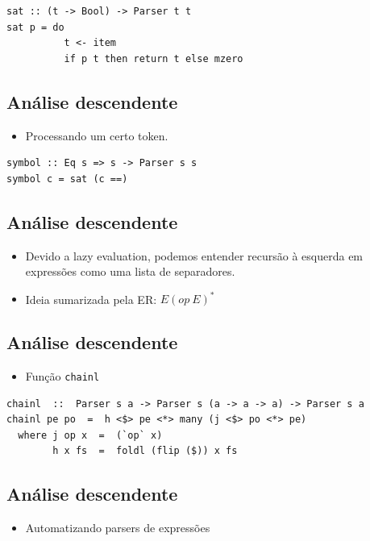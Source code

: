 \documentclass[11pt]{article}
\begin{document}
\begin{verbatim}
sat :: (t -> Bool) -> Parser t t
sat p = do
          t <- item
          if p t then return t else mzero
\end{verbatim}
\subsection*{Análise descendente}
\label{sec:org0662f66}

\begin{itemize}
\item Processando um certo token.
\end{itemize}

\begin{verbatim}
symbol :: Eq s => s -> Parser s s
symbol c = sat (c ==)
\end{verbatim}
\subsection*{Análise descendente}
\label{sec:org99542fd}

\begin{itemize}
\item Devido a lazy evaluation, podemos entender recursão à esquerda em expressões como uma lista de separadores.

\item Ideia sumarizada pela ER: \(E(op\:E)^*\)
\end{itemize}
\subsection*{Análise descendente}
\label{sec:org48047b8}

\begin{itemize}
\item Função \texttt{chainl}
\end{itemize}

\begin{verbatim}
chainl  ::  Parser s a -> Parser s (a -> a -> a) -> Parser s a
chainl pe po  =  h <$> pe <*> many (j <$> po <*> pe)
  where j op x  =  (`op` x)
        h x fs  =  foldl (flip ($)) x fs
\end{verbatim}
\subsection*{Análise descendente}
\label{sec:org7d2e4f5}

\begin{itemize}
\item Automatizando parsers de expressões
\end{itemize}
\end{document}
